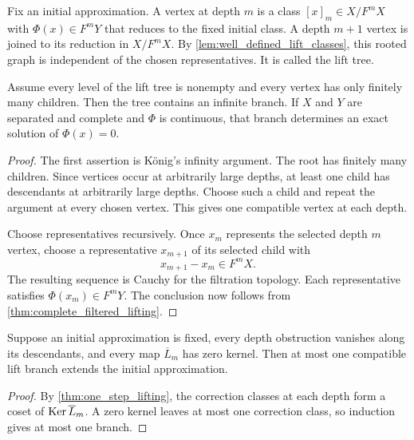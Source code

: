 \begin{definition}\label{def:lift_tree}
Fix an initial approximation.  A vertex at depth $m$ is a class $[x]_m\in X/F^mX$ with $\Phi(x)\in F^mY$ that reduces to the fixed initial class.  A depth $m+1$ vertex is joined to its reduction in $X/F^mX$.  By \cref{lem:well_defined_lift_classes}, this rooted graph is independent of the chosen representatives.  It is called the lift tree.
\end{definition}

\begin{theorem}\label{thm:finitely_branching_lift_tree}
Assume every level of the lift tree is nonempty and every vertex has only finitely many children.  Then the tree contains an infinite branch.  If $X$ and $Y$ are separated and complete and $\Phi$ is continuous, that branch determines an exact solution of $\Phi(x)=0$.
\end{theorem}

\begin{proof}
The first assertion is K\"onig's infinity argument.  The root has finitely many children.  Since vertices occur at arbitrarily large depths, at least one child has descendants at arbitrarily large depths.  Choose such a child and repeat the argument at every chosen vertex.  This gives one compatible vertex at each depth.

Choose representatives recursively.  Once $x_m$ represents the selected depth $m$ vertex, choose a representative $x_{m+1}$ of its selected child with
\[
x_{m+1}-x_m\in F^mX.
\]
The resulting sequence is Cauchy for the filtration topology.  Each representative satisfies $\Phi(x_m)\in F^mY$.  The conclusion now follows from \cref{thm:complete_filtered_lifting}.
\end{proof}

\begin{corollary}\label{cor:unique_lift_branch}
Suppose an initial approximation is fixed, every depth obstruction vanishes along its descendants, and every map $\overline L_m$ has zero kernel.  Then at most one compatible lift branch extends the initial approximation.
\end{corollary}

\begin{proof}
By \cref{thm:one_step_lifting}, the correction classes at each depth form a coset of $\operatorname{Ker}\overline L_m$.  A zero kernel leaves at most one correction class, so induction gives at most one branch.
\end{proof}

